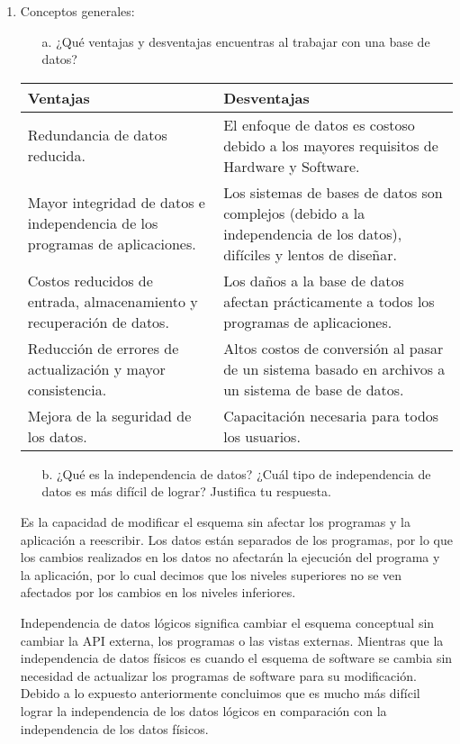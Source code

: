 \documentclass{article}
\begin{document}
\begin{enumerate}
\item Conceptos generales:
\begin{itemize}
    \item[a.]¿Qu\'e ventajas y desventajas encuentras al trabajar con una base de datos?
\end{itemize}

  \color{darkgray}
\begin{table}[H]
    \centering
        \begin{tabular}{|p{6cm} | p{6cm} |}        
        \hline
        \textbf{Ventajas} & \textbf{Desventajas} \\
        \hline
        Redundancia de datos reducida. & El enfoque de datos es costoso debido a los mayores requisitos de Hardware y Software. \\
        \hline
        Mayor integridad de datos e independencia de los programas de aplicaciones. & Los sistemas de bases de datos son complejos (debido a la independencia de los datos), difíciles y lentos de diseñar. \\ 
        \hline 
        Costos reducidos de entrada, almacenamiento y recuperación de datos. & Los daños a la base de datos afectan prácticamente a todos los programas de aplicaciones. \\
        \hline
        Reducción de errores de actualización y mayor consistencia. & Altos costos de conversión al pasar de un sistema basado en archivos a un sistema de base de datos. \\
        \hline
        Mejora de la seguridad de los datos. & Capacitación necesaria para todos los usuarios.\\
        \hline
        \end{tabular}
\end{table}
\begin{itemize}
    \item[b.]¿Qué es la independencia de datos? ¿Cuál tipo de independencia de datos es más difícil de lograr? Justifica tu respuesta.
\end{itemize}
    Es la capacidad de modificar el esquema sin afectar los programas y la aplicación a reescribir. Los datos están separados de los programas, por lo que los cambios realizados en los datos no afectarán la ejecución del programa y la aplicación, por lo cual decimos que los niveles superiores no se ven afectados por los cambios en los niveles inferiores.
    
    Independencia de datos lógicos significa cambiar el esquema conceptual sin cambiar la API externa, los programas o las vistas externas. Mientras que la independencia de datos físicos es cuando el esquema de software se cambia sin necesidad de actualizar los programas de software para su modificación.
    Debido a lo expuesto anteriormente concluimos que es mucho más difícil lograr la independencia de los datos lógicos en comparación con la independencia de los datos físicos.
    

\end{enumerate}
\end{document}
